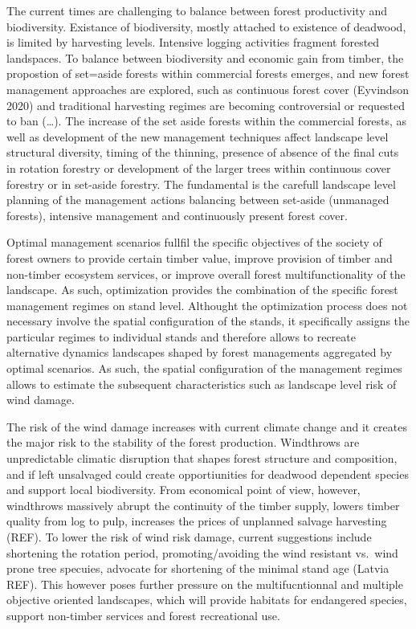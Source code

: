 \documentclass[]{elsarticle} %
\begin{document}
The current times are challenging to balance between forest productivity
and biodiversity. Existance of biodiversity, mostly attached to
existence of deadwood, is limited by harvesting levels. Intensive
logging activities fragment forested landspaces. To balance between
biodiversity and economic gain from timber, the propostion of set=aside
forests within commercial forests emerges, and new forest management
approaches are explored, such as continuous forest cover (Eyvindson
2020) and traditional harvesting regimes are becoming controversial or
requested to ban (\ldots{}). The increase of the set aside forests
within the commercial forests, as well as development of the new
management techniques affect landscape level structural diversity,
timing of the thinning, presence of absence of the final cuts in
rotation forestry or development of the larger trees within continuous
cover forestry or in set-aside forestry. The fundamental is the carefull
landscape level planning of the management actions balancing between
set-aside (unmanaged forests), intensive management and continuously
present forest cover.

Optimal management scenarios fullfil the specific objectives of the
society of forest owners to provide certain timber value, improve
provision of timber and non-timber ecosystem services, or improve
overall forest multifunctionality of the landscape. As such,
optimization provides the combination of the specific forest management
regimes on stand level. Althought the optimization process does not
necessary involve the spatial configuration of the stands, it
specifically assigns the particular regimes to individual stands and
therefore allows to recreate alternative dynamics landscapes shaped by
forest managements aggregated by optimal scenarios. As such, the spatial
configuration of the management regimes allows to estimate the
subsequent characteristics such as landscape level risk of wind damage.

The risk of the wind damage increases with current climate change and it
creates the major risk to the stability of the forest production.
Windthrows are unpredictable climatic disruption that shapes forest
structure and composition, and if left unsalvaged could create
opportiunities for deadwood dependent species and support local
biodiversity. From economical point of view, however, windthrows
massively abrupt the continuity of the timber supply, lowers timber
quality from log to pulp, increases the prices of unplanned salvage
harvesting (REF). To lower the risk of wind risk damage, current
suggestions include shortening the rotation period, promoting/avoiding
the wind resistant vs.~wind prone tree specuies, advocate for shortening
of the minimal stand age (Latvia REF). This however poses further
pressure on the multifucntionnal and multiple objective oriented
landscapes, which will provide habitats for endangered species, support
non-timber services and forest recreational use.
\end{document}

